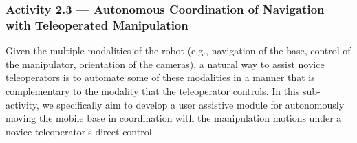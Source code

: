 \documentclass[letterpaper, 11 pt, onecolumn]{article}
\begin{document}

\subsubsection{Activity 2.3 --- Autonomous Coordination of Navigation with Teleoperated Manipulation}\label{sec:plan-intent-SharedAutonomousCoordiantion}


Given the multiple modalities of the robot (e.g., navigation of the base, control of the manipulator, orientation of the cameras), a natural way to assist novice teleoperators is to automate some of these modalities in a manner that is complementary to the modality that the teleoperator controls.
In this sub-activity, we specifically aim to develop a user assistive module for autonomously moving the mobile base in coordination with the manipulation motions under a novice teleoperator's direct control. 
\end{document}
